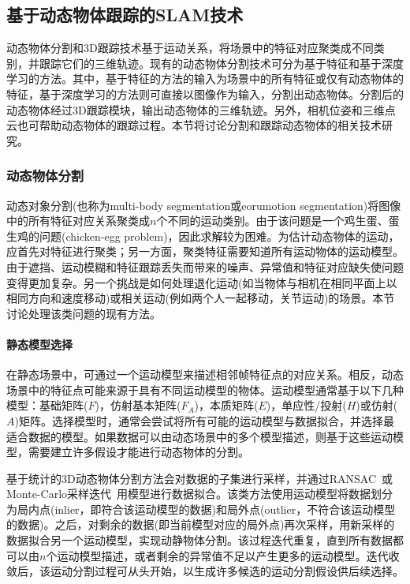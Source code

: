 \subsection{基于动态物体跟踪的SLAM技术}
\label{subsec:object_tracking}
动态物体分割和3D跟踪技术基于运动关系，将场景中的特征对应聚类成不同类别，并跟踪它们的三维轨迹。现有的动态物体分割技术可分为基于特征和基于深度学习的方法。其中，基于特征的方法的输入为场景中的所有特征或仅有动态物体的特征，基于深度学习的方法则可直接以图像作为输入，分割出动态物体。分割后的动态物体经过3D跟踪模块，输出动态物体的三维轨迹。另外，相机位姿和三维点云也可帮助动态物体的跟踪过程。本节将讨论分割和跟踪动态物体的相关技术研究。

\subsubsection{动态物体分割}
动态对象分割(也称为multi-body segmentation或eorumotion segmentation)将图像中的所有特征对应关系聚类成$n$个不同的运动类别。由于该问题是一个鸡生蛋、蛋生鸡的问题(chicken-egg problem)，因此求解较为困难。为估计动态物体的运动，应首先对特征进行聚类；另一方面，聚类特征需要知道所有运动物体的运动模型。由于遮挡、运动模糊和特征跟踪丢失而带来的噪声、异常值和特征对应缺失使问题变得更加复杂。另一个挑战是如何处理退化运动(如当物体与相机在相同平面上以相同方向和速度移动)或相关运动(例如两个人一起移动，关节运动)的场景。本节讨论处理该类问题的现有方法。

\paragraph{静态模型选择}
在静态场景中，可通过一个运动模型来描述相邻帧特征点的对应关系。相反，动态场景中的特征点可能来源于具有不同运动模型的物体。运动模型通常基于以下几种模型：基础矩阵($F$)，仿射基本矩阵($F_A$)，本质矩阵($E$)，单应性/投射($H$)或仿射($A$)矩阵。选择模型时，通常会尝试将所有可能的运动模型与数据拟合，并选择最适合数据的模型。如果数据可以由动态场景中的多个模型描述，则基于这些运动模型，需要建立许多假设才能进行动态物体的分割。

基于统计的3D动态物体分割方法会对数据的子集进行采样，并通过RANSAC~\cite{fischler1981random}或Monte-Carlo采样迭代~\cite{schindler2006two}用模型进行数据拟合。该类方法使用运动模型将数据划分为局内点(inlier，即符合该运动模型的数据)和局外点(outlier，不符合该运动模型的数据)。之后，对剩余的数据(即当前模型对应的局外点)再次采样，用新采样的数据拟合另一个运动模型，实现动静物体分割。该过程迭代重复，直到所有数据都可以由$n$个运动模型描述，或者剩余的异常值不足以产生更多的运动模型。迭代收敛后，该运动分割过程可从头开始，以生成许多候选的运动分割假设供后续选择。

